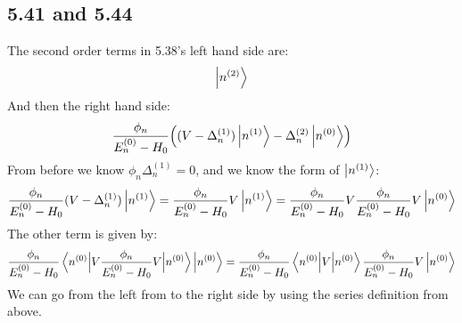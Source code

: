 \documentclass[12pt]{article}
\begin{document}
\subsection{5.41 and 5.44}
The second order terms in 5.38's left hand side are:
\begin{align*}
  \ket{n^{(2)}}
\end{align*}
And then the right hand side:
\begin{align*}
  \frac{\phi_n}{E_n^{(0)}-H_0}\qty((V-\Delta_n^{(1)})\ket{n^{(1)}}
  -\Delta_n^{(2)}\ket{n^{(0)}})
\end{align*}
From before we know $\phi_n\Delta_n^{(1)}=0$, and we know the form of $\ket{n^{(1)}}$:
\begin{align*}
  \frac{\phi_n}{E_n^{(0)}-H_0}(V-\Delta_n^{(1)})\ket{n^{(1)}}=
  \frac{\phi_n}{E_n^{(0)}-H_0}V\ket{n^{(1)}}=
  \frac{\phi_n}{E_n^{(0)}-H_0}V\frac{\phi_n}{E_n^{(0)}-H_0}V\ket{n^{(0)}}
\end{align*}
The other term is given by:
\begin{align*}
  \frac{\phi_n}{E_n^{(0)}-H_0}
  \mel{n^{(0)}}{V\frac{\phi_n}{E_n^{(0)}-H_0}V}{n^{(0)}}\ket{n^{(0)}}=
  \frac{\phi_n}{E_n^{(0)}-H_0}
  \mel{n^{(0)}}{V}{n^{(0)}}\frac{\phi_n}{E_n^{(0)}-H_0}V\ket{n^{(0)}}
\end{align*}
We can go from the left from to the right side by using the series definition from above.
\end{document}
